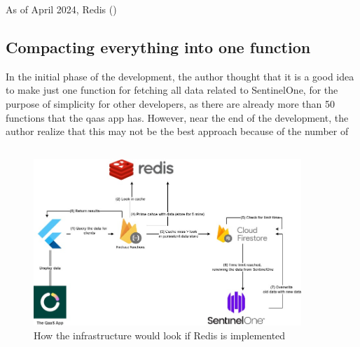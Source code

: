 \begin{multicols}{2}
  As of April 2024, Redis (\textit{\cite{redisIsNoLongerFree}})

  \subsection{Compacting everything into one function}

  In the initial phase of the development, the author thought that it is a good idea to make just one function for fetching all data
  related to SentinelOne, for the purpose of simplicity for other developers, as there are already more than 50 functions that the
  \acrshort{qaas} app has. However, near the end of the development, the author realize that this may not be the best approach because
  of the number of




  \subsection{}
\end{multicols}

\begin{figure}[htbp]
  \centering
  \includegraphics[width=0.9\textwidth]{Figures/Redis Caching.jpg}
  \caption{How the infrastructure would look if Redis is implemented}
\end{figure}